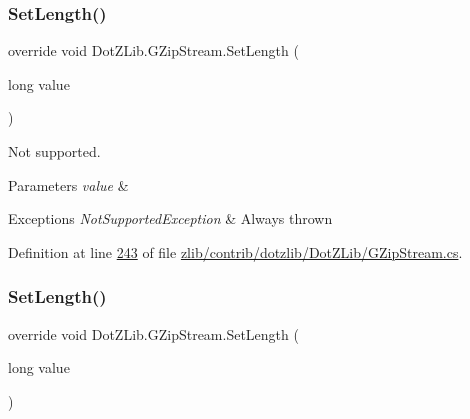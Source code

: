 \subsubsection{\texorpdfstring{Set\+Length()}{SetLength()}\hspace{0.1cm}{\footnotesize\ttfamily [1/2]}}
{\footnotesize\ttfamily override void Dot\+Z\+Lib.\+G\+Zip\+Stream.\+Set\+Length (\begin{DoxyParamCaption}\item[{long}]{value }\end{DoxyParamCaption})\hspace{0.3cm}{\ttfamily [inline]}}



Not supported. 


\begin{DoxyParams}{Parameters}
{\em value} & \\
\hline
\end{DoxyParams}

\begin{DoxyExceptions}{Exceptions}
{\em Not\+Supported\+Exception} & Always thrown\\
\hline
\end{DoxyExceptions}


Definition at line \hyperlink{zlib_2contrib_2dotzlib_2_dot_z_lib_2_g_zip_stream_8cs_source_l00243}{243} of file \hyperlink{zlib_2contrib_2dotzlib_2_dot_z_lib_2_g_zip_stream_8cs_source}{zlib/contrib/dotzlib/\+Dot\+Z\+Lib/\+G\+Zip\+Stream.\+cs}.

\mbox{\label{class_dot_z_lib_1_1_g_zip_stream_a05fff98b765251f87b41318781da71c4}} 
\subsubsection{\texorpdfstring{Set\+Length()}{SetLength()}\hspace{0.1cm}{\footnotesize\ttfamily [2/2]}}
{\footnotesize\ttfamily override void Dot\+Z\+Lib.\+G\+Zip\+Stream.\+Set\+Length (\begin{DoxyParamCaption}\item[{long}]{value }\end{DoxyParamCaption})\hspace{0.3cm}{\ttfamily [inline]}}



